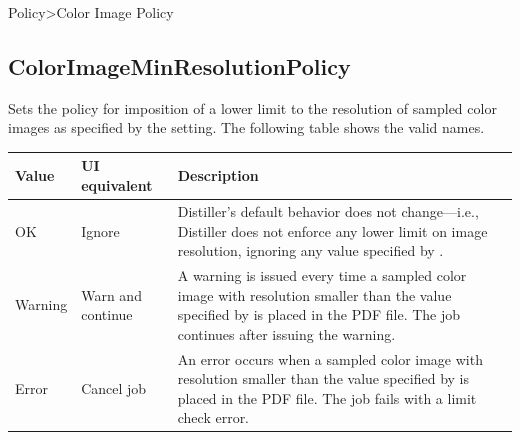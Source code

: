 \documentclass[letterpaper,12pt,english,openany,oneside]{sphinxmanual}
\begin{document}
\label{\detokenize{PDF_Create_CommonSettings:ui-name-20}}

Policy\sphinxhyphen{}>Color Image Policy

\label{\detokenize{PDF_Create_CommonSettings:default-value-24}}

\begin{sphinxVerbatim}[commandchars=\\\{\}]
\end{sphinxVerbatim}




\subsection{ColorImageMinResolutionPolicy}
\label{\detokenize{PDF_Create_CommonSettings:colorimageminresolutionpolicy}}
Sets the policy for imposition of a lower limit to the resolution of sampled color images as specified by the  setting. The following table shows the valid names.


\begin{savenotes}\sphinxattablestart
\centering
{}\label{\detokenize{PDF_Create_CommonSettings:section-6}}\nobreak
\begin{tabulary}{\linewidth}[t]{|T|T|T|}
\hline
\sphinxstyletheadfamily 
Value
&\sphinxstyletheadfamily 
UI equivalent
&\sphinxstyletheadfamily 
Description
\\
\hline
OK
&
Ignore
&
Distiller’s default behavior does not change—i.e., Distiller does not enforce any lower limit on image resolution, ignoring any value specified by  .
\\
\hline
Warning
&
Warn and continue
&
A warning is issued every time a sampled color image with resolution smaller than the value specified by  is placed in the PDF file. The job continues after issuing the warning.
\\
\hline
Error
&
Cancel job
&
An error occurs when a sampled color image with resolution smaller than the value specified by  is placed in the PDF file. The job fails with a limit check error.
\\
\hline
\end{tabulary}
\par
\sphinxattableend\end{savenotes}
\end{document}
